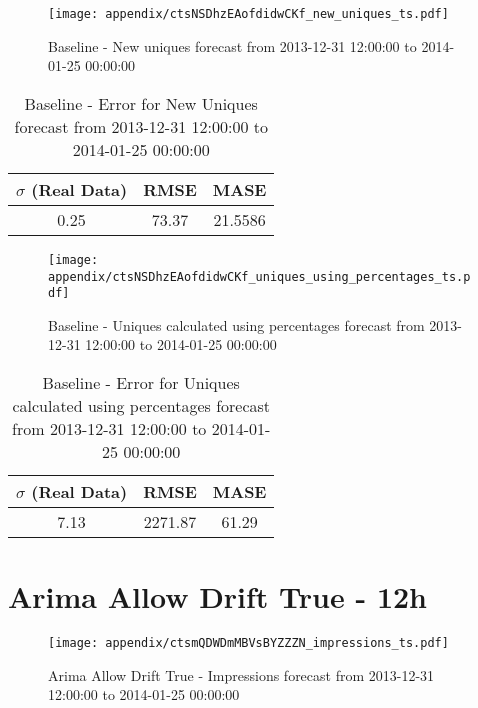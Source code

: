 \begin{figure}[H] \begin{center} \leavevmode
\texttt{[image: appendix/ctsNSDhzEAofdidwCKf\_new\_uniques\_ts.pdf]} \caption{
Baseline - New uniques forecast from 2013-12-31 12:00:00 to 2014-01-25 00:00:00} \label{fig:appendix/ctsNSDhzEAofdidwCKf_new_uniques_ts.pdf} \end{center}
\end{figure}

\begin{table}[H]
\centering
\footnotesize
\begin{tabular}{ccc}
$\sigma$ (Real Data) & RMSE & MASE   \\ \hline
0.25 & 73.37 & 21.5586 \\
\end{tabular}

\vspace{0.5cm}

\caption{
Baseline - Error for New Uniques forecast from 2013-12-31 12:00:00 to 2014-01-25 00:00:00}
\end{table}

\begin{figure}[H] \begin{center} \leavevmode
\texttt{[image: appendix/ctsNSDhzEAofdidwCKf\_uniques\_using\_percentages\_ts.pdf]} \caption{
Baseline - Uniques calculated using percentages forecast from 2013-12-31 12:00:00 to 2014-01-25 00:00:00} \label{fig:appendix/ctsNSDhzEAofdidwCKf_uniques_using_percentages_ts.pdf} \end{center}
\end{figure}

\begin{table}[H]
\centering
\footnotesize
\begin{tabular}{ccc}
$\sigma$ (Real Data) & RMSE & MASE   \\ \hline
7.13 & 2271.87 & 61.29 \\
\end{tabular}

\vspace{0.5cm}

\caption{
Baseline - Error for Uniques calculated using percentages forecast from 2013-12-31 12:00:00 to 2014-01-25 00:00:00}
\end{table}

\section{Arima Allow Drift True - 12h}
\begin{figure}[H] \begin{center} \leavevmode
\texttt{[image: appendix/ctsmQDWDmMBVsBYZZZN\_impressions\_ts.pdf]} \caption{
Arima Allow Drift True - Impressions forecast from 2013-12-31 12:00:00 to 2014-01-25 00:00:00} \label{fig:appendix/ctsmQDWDmMBVsBYZZZN_impressions_ts.pdf} \end{center}
\end{figure}


